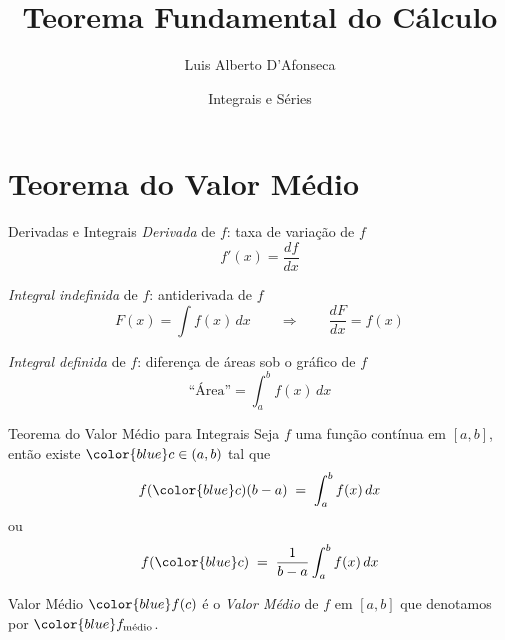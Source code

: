 
\usepackage{apresentacao}
\usepackage{mathconfig}
\usepackage{tabto}

\makeatletter
\graphicspath  {{./figs/}}
\makeatother

\newcommand{\fmedio}{f_{\text{médio}}}

\title {Teorema Fundamental do Cálculo}
\author{\large Luis Alberto D'Afonseca}
\date  {Integrais e Séries}



\begin{frame}
    \titlepage
\end{frame}

\section{Teorema do Valor Médio}

\begin{frame}{Derivadas e Integrais}
\emph{Derivada} de $f$: \quad taxa de variação de $f$
\[
  f'(x) = \frac{df}{dx}
\]

\pause
\emph{Integral indefinida} de $f$: \quad antiderivada de $f$
\[
  F(x) = \int f(x)\,dx \qquad\Rightarrow\qquad \frac{dF}{dx} = f(x)
\]

\pause
\emph{Integral definida} de $f$: \quad diferença de áreas sob o gráfico de $f$
\[
  \text{``Área''} = \int_a^b f(x)\,dx
\]
\end{frame}

\begin{frame}{Teorema do Valor Médio para Integrais}
  Seja $f$ uma função {\color{blue} contínua} em $[a, b]$, \pause
  então existe ${\color{blue} c} \in (a, b)$ \pause
  tal que
  \[
    f({\color{blue}c})(b-a)
    \;=\; \int_a^b f(x)\,dx
  \]
  \pause
  ou
  \[
    f({\color{blue}c})
    \;=\; \frac{1}{b-a}\int_a^b f(x)\,dx
  \]
\end{frame}

\begin{frame}{Valor Médio}
  ${\color{blue}f(c)}$ é o \emph{Valor Médio} de $f$ em $[a, b]$
  que denotamos por ${\color{blue}f_{\text{médio}}}$.
\end{frame}

